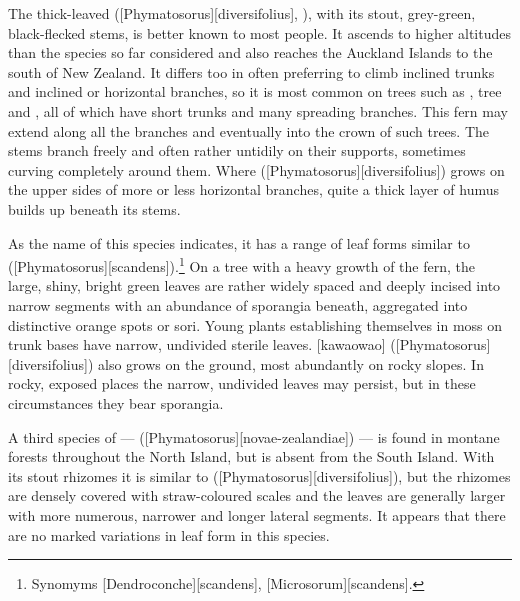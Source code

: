 The thick-leaved  ([Phymatosorus][diversifolius], ), with its stout, grey-green, black-flecked stems, is better known to most people.
It ascends to higher altitudes than the species so far considered and also reaches the Auckland Islands to the south of New Zealand.
It differs too in often preferring to climb inclined trunks and inclined or horizontal branches, so it is most common on trees such as , tree  and , all of which have short trunks and many spreading branches.
This fern may extend along all the branches and eventually into the crown of such trees.
The stems branch freely and often rather untidily on their supports, sometimes curving completely around them.
Where  ([Phymatosorus][diversifolius]) grows on the upper sides of more or less horizontal branches, quite a thick layer of humus builds up beneath its stems.

As the name of this species indicates, it has a range of leaf forms similar to  ([Phymatosorus][scandens]).\footnote{Synomyms [Dendroconche][scandens], [Microsorum][scandens].}
On a tree with a heavy growth of the fern, the large, shiny, bright green leaves are rather widely spaced and deeply incised into narrow segments with an abundance of sporangia beneath, aggregated into distinctive orange spots or sori.
Young plants establishing themselves in moss on trunk bases have narrow, undivided sterile leaves.
[kawaowao] ([Phymatosorus][diversifolius]) also grows on the ground, most abundantly on rocky slopes.
In rocky, exposed places the narrow, undivided leaves may persist, but in these circumstances they bear sporangia.

A third species of  ---  ([Phymatosorus][novae-zealandiae]) --- is found in montane forests throughout the North Island, but is absent from the South Island.
With its stout rhizomes it is similar to  ([Phymatosorus][diversifolius]), but the rhizomes are densely covered with straw-coloured scales and the leaves are generally larger with more numerous, narrower and longer lateral segments.
It appears that there are no marked variations in leaf form in this species.

